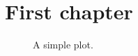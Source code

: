 \documentclass[10pt]{scrartcl}
\begin{document}
\the\textwidth

\section{First chapter}

\Blindtext
\begin{figure}
    \centering
    
    \caption{A simple plot.\label{fig:test}}
\end{figure}
\blindtext
\end{document}
